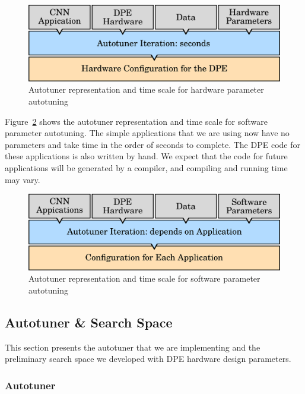 \begin{figure}[htpb]
    \centering
    \includegraphics[width=.65\textwidth]{./images/overview_dpe_hard}
    \caption{Autotuner representation and time scale for hardware parameter
    autotuning}
    \label{fig:overview-dpe-hard}
\end{figure}

Figure~\ref{fig:overview-dpe-app} shows the autotuner representation and time
scale for software parameter autotuning. The simple applications that we are
using now have no parameters and take time in the order of seconds to complete.
The DPE code for these applications is also written by hand. We expect that the
code for future applications will be generated by a compiler, and compiling and
running time may vary.

\begin{figure}[htpb]
    \centering
    \includegraphics[width=.65\textwidth]{./images/overview_dpe_app}
    \caption{Autotuner representation and time scale for software parameter
    autotuning}
    \label{fig:overview-dpe-app}
\end{figure}

\subsection{Autotuner \& Search Space}
\label{sec:DPEautotuning}

This section presents the autotuner that we are implementing and the
preliminary search space we developed with DPE hardware design parameters.

\subsubsection{Autotuner}


